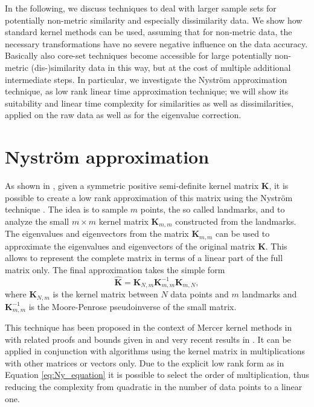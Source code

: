 \documentclass[twoside,11pt]{article}
\begin{document}
In the following, we discuss techniques to deal with larger sample sets
for potentially non-metric similarity and especially dissimilarity data.
We show how standard kernel methods can be used,
assuming that for non-metric data,
the necessary transformations have no severe negative
influence on the data accuracy. Basically also core-set techniques \cite{DBLP:journals/comgeo/BadoiuC08}
become accessible for large potentially non-metric (dis-)similarity data in this way, but at the cost of multiple additional intermediate steps.
In particular, we investigate the Nystr\"om approximation technique,
as low rank linear time approximation technique;
we will show its suitability and linear time complexity
for similarities as well as dissimilarities,
applied on the raw data as well as for the eigenvalue correction.

\section{Nystr\"om approximation}
\label{sec:ny_approx}
As shown in \cite{DBLP:conf/nips/WilliamsS00}, given a symmetric positive semi-definite kernel matrix $\mathbf{K}$,
it is possible to create a low rank approximation of this matrix
using the Nystr\"om technique \cite{ny_orig}.
The idea is to sample $m$ points, the so called landmarks,
and to analyze the small $m \times m$ kernel matrix $\mathbf{K}_{m,m}$
constructed from the landmarks.
The eigenvalues and eigenvectors from the matrix $\mathbf{K}_{m,m}$
can be used to approximate the eigenvalues and eigenvectors
of the original matrix $\mathbf{K}$.
This allows to represent the complete matrix in terms
of a linear part of the full matrix only.
The final approximation takes the simple form
\begin{equation}
\mathbf{\hat{K}}=\mathbf{K}_{N,m} \mathbf{K}^{-1}_{m,m} \mathbf{K}_{m,N},
\label{eq:Ny_equation}
\end{equation}
where $\mathbf{K}_{N,m}$ is the kernel matrix between $N$ data points and $m$ landmarks
and $\mathbf{K}^{-1}_{m,m}$ is the Moore-Penrose pseudoinverse of the small matrix.

This technique has been proposed
in the context of Mercer kernel methods in \cite{DBLP:conf/nips/WilliamsS00}
with related proofs and bounds given in \cite{DBLP:journals/jmlr/DrineasM05}
and very recent results in \cite{DBLP:journals/corr/abs-1303-1849}.
It can be applied in conjunction with algorithms using the kernel matrix
in multiplications with other matrices or vectors only.
Due to the explicit low rank form as in Equation \eqref{eq:Ny_equation}
it is possible to select the order of multiplication,
thus reducing the complexity
from quadratic in the number of data points to a linear one.
\end{document}
